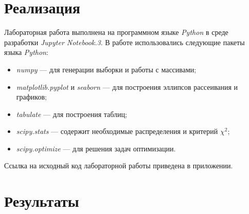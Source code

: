 \documentclass[12pt,a4paper]{article}
\begin{document}
\section{Реализация}
	Лабораторная работа выполнена на программном языке \emph{Python} в среде разработки \emph{Jupyter Notebook.3}. В работе использовались следующие пакеты языка \emph{Python}:
	\begin{itemize}
		\item \emph{numpy} --- для генерации выборки и работы с массивами;
		
		\item \emph{matplotlib.pyplot} и \emph{seaborn} --- для построения эллипсов рассеивания и графиков;
		
		\item \emph{tabulate} --- для построения таблиц;
		
		\item \emph{scipy.stats} --- содержит необходимые распределения и критерий $\chi^2$;
		
		\item \emph{scipy.optimize} --- для решения задач оптимизации.
	\end{itemize}
	Ссылка на исходный код лабораторной работы приведена в приложении.
		
\section{Результаты}
\end{document}
